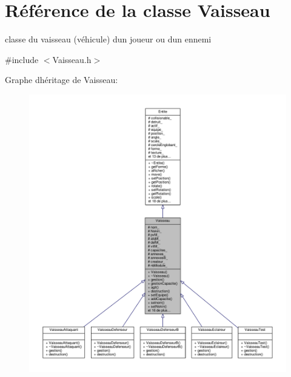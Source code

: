 \hypertarget{class_vaisseau}{}\section{Référence de la classe Vaisseau}
\label{class_vaisseau}


classe du vaisseau (véhicule) d\textquotesingle{}un joueur ou d\textquotesingle{}un ennemi  




{\ttfamily \#include $<$Vaisseau.\+h$>$}



Graphe d\textquotesingle{}héritage de Vaisseau\+:\nopagebreak
\begin{figure}[H]
\begin{center}
\leavevmode
\includegraphics[width=350pt]{class_vaisseau__inherit__graph}
\end{center}
\end{figure}


